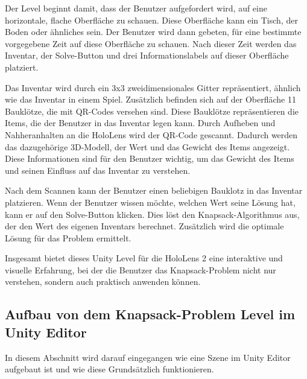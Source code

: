 Der Level beginnt damit, dass der Benutzer aufgefordert wird, auf eine
horizontale, flache Oberfläche zu schauen. Diese Oberfläche kann ein Tisch,
der Boden oder ähnliches sein. Der Benutzer wird dann gebeten, für eine bestimmte
vorgegebene Zeit auf diese Oberfläche zu schauen. Nach dieser Zeit werden das Inventar,
der Solve-Button und drei Informationslabels auf dieser Oberfläche platziert.

Das Inventar wird durch ein 3x3 zweidimensionales Gitter repräsentiert, ähnlich
wie das Inventar in einem Spiel. Zusätzlich befinden sich auf der Oberfläche 11 Bauklötze,
die mit QR-Codes versehen sind. Diese Bauklötze repräsentieren die Items, die der Benutzer
in das Inventar legen kann. Durch Aufheben und Nahheranhalten an die HoloLens wird der QR-Code gescannt.
Dadurch werden das dazugehörige 3D-Modell, der Wert und das Gewicht des Items angezeigt.
Diese Informationen sind für den Benutzer wichtig, um das Gewicht des Items und
seinen Einfluss auf das Inventar zu verstehen.

Nach dem Scannen kann der Benutzer einen beliebigen Bauklotz in das Inventar platzieren.
Wenn der Benutzer wissen möchte, welchen Wert seine Lösung hat, kann er auf den Solve-Button
klicken. Dies löst den Knapsack-Algorithmus aus, der den Wert des eigenen Inventars berechnet.
Zusätzlich wird die optimale Lösung für das Problem ermittelt.

Insgesamt bietet dieses Unity Level für die HoloLens 2 eine interaktive und visuelle Erfahrung,
bei der die Benutzer das Knapsack-Problem nicht nur verstehen, sondern auch praktisch anwenden können.

\subsection{Aufbau von dem Knapsack-Problem Level im Unity Editor}
In diesem Abschnitt wird darauf eingegangen wie eine Szene im Unity Editor aufgebaut ist und wie diese
Grundsätzlich funktionieren. \\


